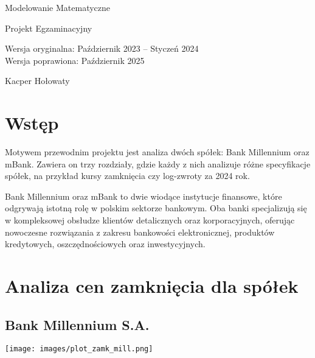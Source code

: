 \documentclass[12pt]{article}
\begin{document}
\begin{titlepage}
   \begin{center}
        \vspace*{4cm}
        
       
       \Huge{Modelowanie Matematyczne} 
        \hline

        \vspace{0.2cm}
        \Large{Projekt Egzaminacyjny} 

        \vspace{0.3cm}
        \large{Wersja oryginalna: Październik 2023 -- Styczeń 2024}\\
        \large{Wersja poprawiona: Październik 2025}
        
        \vspace{2 cm}
        \large{Kacper Hołowaty}
       
     
       

       \vfill
    \end{center}
\end{titlepage}
\newpage
\tableofcontents
\newpage

\section{Wstęp} 

Motywem przewodnim projektu jest analiza dwóch spółek: Bank Millennium oraz mBank. Zawiera on trzy rozdziały, gdzie każdy z nich analizuje różne specyfikacje spółek, na przykład kursy zamknięcia czy log-zwroty za 2024 rok.
\par
Bank Millennium oraz mBank to dwie wiodące instytucje finansowe, które odgrywają istotną rolę w polskim sektorze bankowym. Oba banki specjalizują się w kompleksowej obsłudze klientów detalicznych oraz korporacyjnych, oferując nowoczesne rozwiązania z zakresu bankowości elektronicznej, produktów kredytowych, oszczędnościowych oraz inwestycyjnych.

\section{Analiza cen zamknięcia dla spółek}
    \vspace{0.5cm}
\subsection{Bank Millennium S.A.}
    \vspace{0.5 cm}

\begin{center}
\texttt{[image: images/plot\_zamk\_mill.png]}
\end{center}
  \vspace{1 cm}
\end{document}
